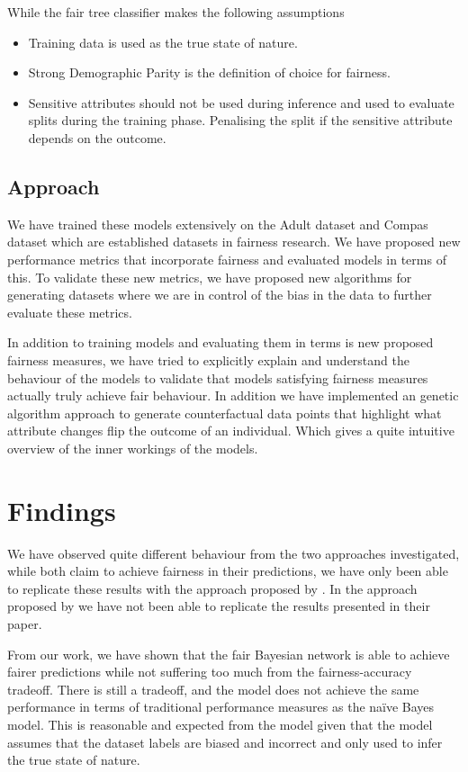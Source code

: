 While the fair tree classifier makes the following assumptions

\begin{itemize}
    \item Training data is used as the true state of nature.
    \item Strong Demographic Parity is the definition of choice for fairness.
    \item Sensitive attributes should not be used during inference and used to evaluate splits during the training phase. Penalising the split if the sensitive attribute depends on the outcome.
\end{itemize}

\subsection{Approach}

We have trained these models extensively on the Adult dataset and Compas dataset which are established datasets in fairness research. We have proposed new performance metrics that incorporate fairness and evaluated models in terms of this. To validate these new metrics, we have proposed new algorithms for generating datasets where we are in control of the bias in the data to further evaluate these metrics.

In addition to training models and evaluating them in terms is new proposed fairness measures, we have tried to explicitly explain and understand the behaviour of the models to validate that models satisfying fairness measures actually truly achieve fair behaviour. In addition we have implemented an genetic algorithm approach to generate counterfactual data points that highlight what attribute changes flip the outcome of an individual. Which gives a quite intuitive overview of the inner workings of the models.

\section{Findings}

We have observed quite different behaviour from the two approaches investigated, while both claim to achieve fairness in their predictions, we have only been able to replicate these results with the approach proposed by \citet{Choi:2021:AIII}. In the approach proposed by \citet{Antonio:2021:arXiv} we have not been able to replicate the results presented in their paper.

From our work, we have shown that the fair Bayesian network is able to achieve fairer predictions while not suffering too much from the fairness-accuracy tradeoff. There is still a tradeoff, and the model does not achieve the same performance in terms of traditional performance measures as the naïve Bayes model. This is reasonable and expected from the model given that the model assumes that the dataset labels are biased and incorrect and only used to infer the true state of nature. 

